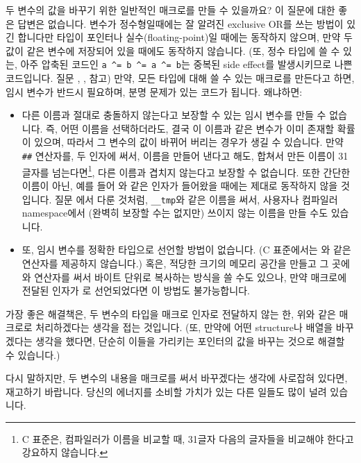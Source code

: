 \begin{faq}
	두 변수의 값을 바꾸기 위한 일반적인 매크로를 만들 수 있을까요?
\A
	이 질문에 대한 좋은 답변은 없습니다.  변수가 정수형일때에는
	잘 알려진 exclusive OR를 쓰는 방법이 있긴 합니다만 타입이 포인터나
	실수(floating-point)일 때에는 동작하지 않으며, 만약 두 값이 같은
        변수에 저장되어 있을 때에도 동작하지 않습니다. (또,
          정수 타입에 쓸 수 있는, 아주 압축된 코드인
          \verb+a ^= b ^= a ^= b+는 중복된 side effect를 발생시키므로
          나쁜 코드입니다. 질문 , ,  참고)
        만약, 모든 타입에 대해 쓸 수 있는
        매크로를 만든다고 하면, 임시 변수가 반드시 필요하며, 분명 문제가
        있는 코드가 됩니다. 왜냐하면:
        \begin{itemize}
          \item 다른 이름과 절대로 충돌하지 않는다고 보장할 수 있는
            임시 변수를 만들 수 없습니다. 즉, 어떤 이름을 선택하더라도,
            결국 이 이름과 같은 변수가 이미 존재할 확률이 있으며, 따라서
            그 변수의 값이 바뀌어 버리는 경우가 생길 수 있습니다. 만약 
            \verb+##+
            연산자를, 두 인자에 써서, 이름을 만들어 낸다고 해도, 합쳐서
            만든 이름이 31 글자를 넘는다면\footnote{C 표준은, 컴파일러가
              이름을 비교할 때, 31글자 다음의 글자들을 비교해야 한다고
              강요하지 않습니다.}, 다른
            이름과 겹치지 않는다고 보장할 수 없습니다.  또한 간단한 이름이
            아닌, 예를 들어 와 같은 인자가 들어왔을 때에는 제대로
            동작하지 않을 것입니다.  질문 에서 다룬 것처럼, \verb+__tmp+와
            같은 이름을 써서, 사용자나 컴파일러 namespace에서 (완벽히 보장할
            수는 없지만) 쓰이지 않는 이름을 만들 수도 있습니다.
          \item 또, 임시 변수를 정확한 타입으로 선언할 방법이 없습니다.
            (C 표준에서는 와 같은 연산자를 제공하지 않습니다.)
            혹은, 적당한 크기의 메모리 공간을 만들고 그 곳에 와
             연산자를 써서 바이트 단위로 복사하는 방식을 쓸 수도
            있으나, 만약 매크로에 전달된 인자가 로 선언되었다면
            이 방법도 불가능합니다.
        \end{itemize}

        가장 좋은 해결책은, 두 변수의 타입을 매크로 인자로 전달하지 않는 한,
        위와 같은 매크로로 처리하겠다는 생각을 접는 것입니다.
        (또, 만약에 어떤 structure나 배열을 바꾸겠다는 생각을 했다면,
        단순히 이들을 가리키는 포인터의 값을 바꾸는 것으로 해결할 수
        있습니다.)

        다시 말하지만, 두 변수의 내용을 매크로를 써서 바꾸겠다는 생각에
        사로잡혀 있다면, 재고하기 바랍니다. 당신의 에너지를 소비할 가치가
        있는 다른 일들도 많이 널려 있습니다.
\end{faq}

